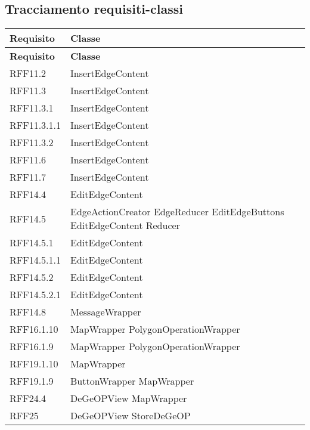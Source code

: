 	\newpage
	
	\subsection{Tracciamento requisiti-classi}
	
	\def\arraystretch{1.5}
	\begin{longtable}{p{2.5cm}!{\VRule[1pt]}p{5cm}}
		\color{white} \textbf{Requisito} & \color{white} \textbf{Classe} \\ 
		\endfirsthead
		\color{white} \textbf{Requisito} & \color{white} \textbf{Classe} \\ 
		\endhead
		RFF11.2 & InsertEdgeContent\\
		RFF11.3 & InsertEdgeContent\\
		RFF11.3.1 & InsertEdgeContent\\
		RFF11.3.1.1 & InsertEdgeContent\\
		RFF11.3.2 & InsertEdgeContent\\
		RFF11.6 & InsertEdgeContent\\
		RFF11.7 & InsertEdgeContent\\
		RFF14.4 & EditEdgeContent\\
		RFF14.5 & EdgeActionCreator \newline EdgeReducer \newline EditEdgeButtons \newline EditEdgeContent \newline Reducer\\
		RFF14.5.1 & EditEdgeContent\\
		RFF14.5.1.1 & EditEdgeContent\\
		RFF14.5.2 & EditEdgeContent\\
		RFF14.5.2.1 & EditEdgeContent\\
		RFF14.8 & MessageWrapper\\
		RFF16.1.10 & MapWrapper \newline PolygonOperationWrapper\\
		RFF16.1.9 & MapWrapper \newline PolygonOperationWrapper\\
		RFF19.1.10 & MapWrapper\\
		RFF19.1.9 & ButtonWrapper \newline MapWrapper\\
		RFF24.4 & DeGeOPView \newline MapWrapper\\
		RFF25 & DeGeOPView \newline StoreDeGeOP\\

\end{longtable}
